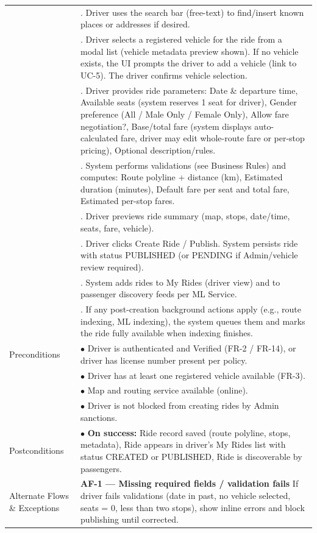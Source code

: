 \begin{longtable}{|>{\raggedright\arraybackslash}p{4cm}|>{\raggedright\arraybackslash}p{11cm}|}
& 4. Driver uses the search bar (free-text) to find/insert known places or addresses if desired. \\
& 5. Driver selects a registered vehicle for the ride from a modal list (vehicle metadata preview shown). If no vehicle exists, the UI prompts the driver to add a vehicle (link to UC-5). The driver confirms vehicle selection. \\
& 6. Driver provides ride parameters: Date \& departure time, Available seats (system reserves 1 seat for driver), Gender preference (All / Male Only / Female Only), Allow fare negotiation?, Base/total fare (system displays auto-calculated fare, driver may edit whole-route fare or per-stop pricing), Optional description/rules. \\
& 7. System performs validations (see Business Rules) and computes: Route polyline + distance (km), Estimated duration (minutes), Default fare per seat and total fare, Estimated per-stop fares. \\
& 8. Driver previews ride summary (map, stops, date/time, seats, fare, vehicle). \\
& 9. Driver clicks Create Ride / Publish. System persists ride with status PUBLISHED (or PENDING if Admin/vehicle review required). \\
& 10. System adds rides to My Rides (driver view) and to passenger discovery feeds per ML Service. \\
& 11. If any post-creation background actions apply (e.g., route indexing, ML indexing), the system queues them and marks the ride fully available when indexing finishes. \\
\hline
Preconditions & $\bullet$ Driver is authenticated and Verified (FR-2 / FR-14), or driver has license number present per policy. \\
& $\bullet$ Driver has at least one registered vehicle available (FR-3). \\
& $\bullet$ Map and routing service available (online). \\
& $\bullet$ Driver is not blocked from creating rides by Admin sanctions. \\
\hline
Postconditions & $\bullet$ \textbf{On success:} Ride record saved (route polyline, stops, metadata), Ride appears in driver's My Rides list with status CREATED or PUBLISHED, Ride is discoverable by passengers. \\
\hline
Alternate Flows \& Exceptions & \textbf{AF-1 — Missing required fields / validation fails} \newline If driver fails validations (date in past, no vehicle selected, seats = 0, less than two stops), show inline errors and block publishing until corrected. \\

\end{longtable}
